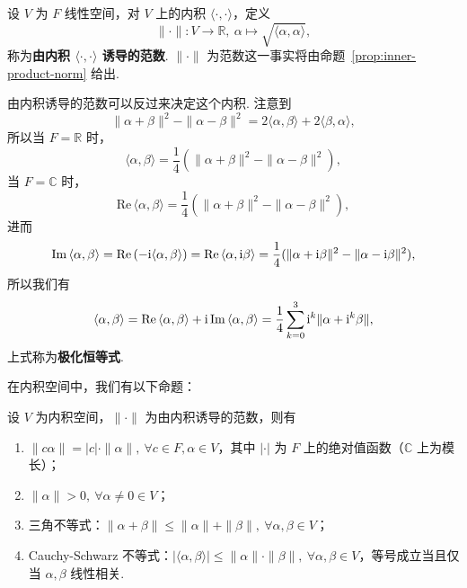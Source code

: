 \documentclass[../main.tex]{subfiles}
\begin{document}
设 $V$ 为 $F$ 线性空间，对 $V$ 上的内积 $\langle \cdot, \cdot \rangle$，定义 
$$
\|\cdot\|:V \to \mathbb R,\ \alpha \mapsto \sqrt{\langle \alpha, \alpha \rangle}, 
$$
称为\textbf{由内积 $\langle \cdot, \cdot \rangle$ 诱导的范数}. $\|\cdot\|$ 为范数这一事实将由命题~\ref{prop:inner-product-norm} 给出. 

由内积诱导的范数可以反过来决定这个内积. 注意到 
$$
\|\alpha + \beta\|^2 - \|\alpha - \beta\|^2 = 2\langle \alpha, \beta \rangle + 2\langle \beta, \alpha \rangle, 
$$
所以当 $F = \mathbb R$ 时，
$$
\langle \alpha, \beta \rangle = \frac{1}{4} (\|\alpha + \beta\|^2 - \|\alpha - \beta\|^2), 
$$
当 $F = \mathbb C$ 时，
$$
\mathrm{Re}\, \langle \alpha, \beta \rangle = \frac{1}{4} (\|\alpha + \beta\|^2 - \|\alpha - \beta\|^2), 
$$
进而 
$$
\mathrm{Im}\, \langle \alpha, \beta \rangle = \mathrm{Re}\, (-\mathrm{i}\langle \alpha, \beta \rangle) = \mathrm{Re}\, \langle \alpha, \mathrm{i}\beta \rangle = \frac{1}{4} (\|\alpha + \mathrm{i}\beta\|^2 - \|\alpha - \mathrm{i}\beta\|^2), 
$$
所以我们有
$$
\langle \alpha, \beta \rangle = \mathrm{Re}\, \langle \alpha, \beta \rangle + \mathrm{i}\, \mathrm{Im}\, \langle \alpha, \beta \rangle = \frac{1}{4} \sum\limits_{k = 0}^{3} \mathrm{i}^k \|\alpha + \mathrm{i}^k \beta\|, 
$$
上式称为\textbf{极化恒等式}. 

在内积空间中，我们有以下命题：

\begin{proposition} \label{prop:inner-product-norm}
    设 $V$ 为内积空间，$\|\cdot\|$ 为由内积诱导的范数，则有
    \begin{enumerate}[label = (\alph*)]
        \item $\|c\alpha\| = |c| \cdot \|\alpha\|,\ \forall c \in F, \alpha \in V$，其中 $|\cdot|$ 为 $F$ 上的绝对值函数（$\mathbb C$ 上为模长）；
        \item $\|\alpha\| > 0,\ \forall \alpha \neq 0 \in V$；
        \item 三角不等式：$\|\alpha + \beta\| \leqslant \|\alpha\| + \|\beta\|,\ \forall \alpha, \beta \in V$；
        \item Cauchy-Schwarz 不等式：$|\langle \alpha, \beta \rangle| \leqslant \|\alpha\| \cdot \|\beta\|,\ \forall \alpha, \beta \in V$，等号成立当且仅当 $\alpha, \beta$ 线性相关. 
    \end{enumerate}
\end{proposition}
\end{document}
